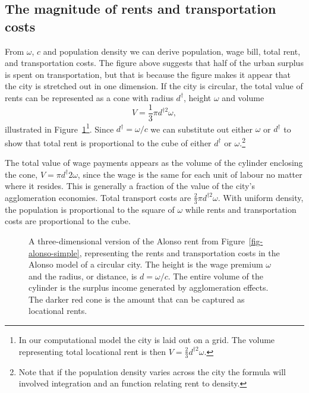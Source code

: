 
 \subsection{The magnitude of rents and transportation costs}
 From $\omega$, $c$ and population density we can derive population, wage bill, total rent, and transportation costs. The figure above suggests that  half of the urban surplus is spent on transportation, but that is because the figure makes it appear that the city is stretched out in one dimension. If  the city is circular, the total value of rents can be represented as  a cone with radius $d^\dagger$, height $\omega$ and volume  \[ V=\frac{1}{3}\pi  d^{\dagger2} \omega, \]
illustrated in Figure~\ref{fig-city-conical}\footnote{In our computational model the city is  laid out on a grid. The volume representing total locational rent is then $V=\frac{2}{3}  d^{\dagger2} \omega$.}. 
Since $d^\dagger=\omega/c$ we can substitute out either  $\omega$ or  $d^\dagger$ to show that total rent is  proportional to the cube of either  $d^\dagger$ or $\omega$.\footnote{Note that if the population density varies across the city the formula will involved integration and an function relating rent to density. } 

The total value of wage payments appears as the volume of the cylinder enclosing the cone, $V=\pi d^\dagger 2 \omega$, since the wage is the same for each unit of labour no matter where it resides. This is generally a fraction of the value of the city's agglomeration economies. 
Total transport costs are $\frac{2}{3}\pi  d^{\dagger 2} \omega$. 
With uniform density, the population is proportional to the square of  $\omega$ while rents and transportation costs are proportional to the cube. %


\begin{figure}
    \begin{center}
    
    \caption[A three-dimensional version of the Alonso model]{A three-dimensional version of the Alonso rent from Figure~\ref{fig-alonso-simple}, representing the rents and transportation costs in the Alonso model of a circular city. The height is the wage premium $\omega$ and the radius, or distance, is  %
    $d=\omega/c$. The entire volume of the cylinder is the surplus income generated by agglomeration effects. The darker red cone is the amount that can be captured as locational rents.}
    \label{fig-city-conical}
    \end{center}
\end{figure}

